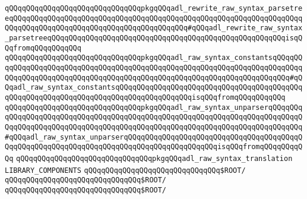 \verb|qQQqqQQqqQQqqQQqqQQqqQQqqQQqqQQqpkgqQQqadl_rewrite_raw_syntax_parsetreeqQQqqQQqqQQqqQQqqQQqqQQqqQQqqQQqqQQqqQQqqQQqqQQqqQQqqQQqqQQqqQQqqQQqqQQqqQQqqQQqqQQqqQQqqQQqqQQqqQQqqQQqqQQqqQQq#qQQqadl_rewrite_raw_syntax_parsetreeqQQqqQQqqQQqqQQqqQQqqQQqqQQqqQQqqQQqqQQqqQQqqQQqqQQqqQQqisqQQqfromqQQqqQQqqQQq|\newline
\verb|qQQqqQQqqQQqqQQqqQQqqQQqqQQqqQQqpkgqQQqadl_raw_syntax_constantsqQQqqQQqqQQqqQQqqQQqqQQqqQQqqQQqqQQqqQQqqQQqqQQqqQQqqQQqqQQqqQQqqQQqqQQqqQQqqQQqqQQqqQQqqQQqqQQqqQQqqQQqqQQqqQQqqQQqqQQqqQQqqQQqqQQqqQQqqQQqqQQq#qQQqadl_raw_syntax_constantsqQQqqQQqqQQqqQQqqQQqqQQqqQQqqQQqqQQqqQQqqQQqqQQqqQQqqQQqqQQqqQQqqQQqqQQqqQQqqQQqqQQqqQQqisqQQqfromqQQqqQQqqQQq|\newline
\verb|qQQqqQQqqQQqqQQqqQQqqQQqqQQqqQQqpkgqQQqadl_raw_syntax_unparserqQQqqQQqqQQqqQQqqQQqqQQqqQQqqQQqqQQqqQQqqQQqqQQqqQQqqQQqqQQqqQQqqQQqqQQqqQQqqQQqqQQqqQQqqQQqqQQqqQQqqQQqqQQqqQQqqQQqqQQqqQQqqQQqqQQqqQQqqQQqqQQqqQQq#qQQqadl_raw_syntax_unparserqQQqqQQqqQQqqQQqqQQqqQQqqQQqqQQqqQQqqQQqqQQqqQQqqQQqqQQqqQQqqQQqqQQqqQQqqQQqqQQqqQQqqQQqqQQqisqQQqfromqQQqqQQqqQQq|\newline
\verb|qQQqqQQqqQQqqQQqqQQqqQQqqQQqqQQqpkgqQQqadl_raw_syntax_translation|\newline
\newline
\newline
\newline
\verb|LIBRARY_COMPONENTS|\newline
\newline
\verb|qQQqqQQqqQQqqQQqqQQqqQQqqQQqqQQq$ROOT/|\newline
\newline
\verb|qQQqqQQqqQQqqQQqqQQqqQQqqQQqqQQq$ROOT/|\newline
\newline
\verb|qQQqqQQqqQQqqQQqqQQqqQQqqQQqqQQq$ROOT/|\newline
